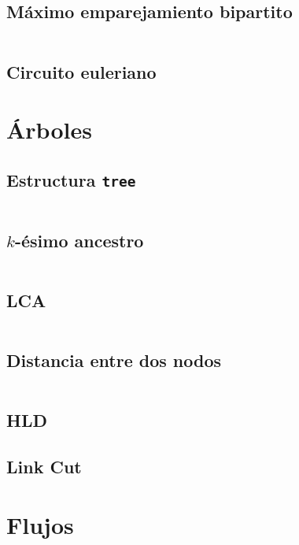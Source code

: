 \documentclass[11pt]{article}
\begin{document}
		\subsection{Máximo emparejamiento bipartito}
		\inputminted[tabsize=2,breaklines,firstline=355,lastline=409,fontsize=\small]{c++}{graph.cpp}
		
		\subsection{Circuito euleriano}
		
		
	\newpage
	\section{Árboles}		
		\subsection{Estructura \texttt{tree}}
		\inputminted[tabsize=2,breaklines,firstline=432,lastline=470,fontsize=\small]{c++}{graph.cpp}
		
		\subsection{$k$-ésimo ancestro}
		\inputminted[tabsize=2,breaklines,firstline=472,lastline=484,fontsize=\small]{c++}{graph.cpp}
		
		\subsection{LCA}
		\inputminted[tabsize=2,breaklines,firstline=486,lastline=505,fontsize=\small]{c++}{graph.cpp}
		
		\subsection{Distancia entre dos nodos}
		\inputminted[tabsize=2,breaklines,firstline=507,lastline=530,fontsize=\small]{c++}{graph.cpp}
		
		\subsection{HLD}
		
		
		\subsection{Link Cut}
		
		
	\newpage
	\section{Flujos}
\end{document}
